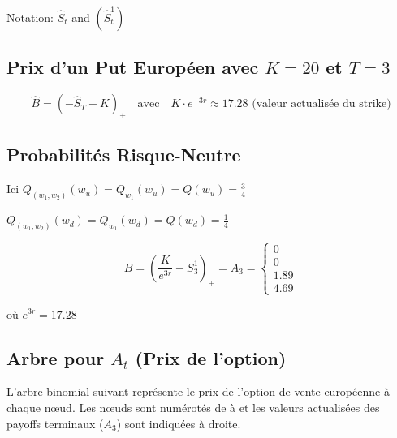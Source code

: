\vspace{1cm}

\noindent Notation: $\hat{S}_t$ and $\left(\hat{S}_t^1\right)$

\vspace{1cm}

\subsection*{Prix d'un Put Européen avec $K=20$ et $T=3$}

$$\hat{B} = \left(-\hat{S}_T + K\right)_+ \quad \text{avec} \quad K \cdot e^{-3r} \approx 17.28 \text{ (valeur actualisée du strike)}$$

\newpage

\subsection*{Probabilités Risque-Neutre}

Ici $Q_{(w_1,w_2)}(w_u) = Q_{w_1}(w_u) = Q(w_u) = \frac{3}{4}$

$Q_{(w_1,w_2)}(w_d) = Q_{w_1}(w_d) = Q(w_d) = \frac{1}{4}$

\vspace{0.5cm}

$$B = \left(\frac{K}{e^{3r}} - S_3^1\right)_+ = A_3 = \begin{cases}
0 \\
0 \\
1.89 \\
4.69
\end{cases}$$

où $e^{3r} = 17.28$

\subsection*{Arbre pour $A_t$ (Prix de l'option)}

L'arbre binomial suivant représente le prix de l'option de vente européenne à chaque nœud. Les nœuds sont numérotés de  à  et les valeurs actualisées des payoffs terminaux ($A_3$) sont indiquées à droite.

